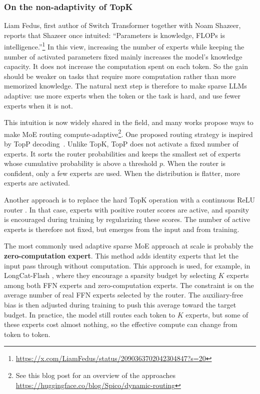\subsubsection{On the non-adaptivity of TopK}
Liam Fedus, first author of Switch Transformer together with Noam Shazeer,
reports that Shazeer once intuited:
``Parameters is knowledge, FLOPs is intelligence.''\footnote{
    \url{https://x.com/LiamFedus/status/2090363702042304847?s=20}
}
In this view, increasing the number of experts while keeping the number of
activated parameters fixed mainly increases the model's knowledge capacity.
It does not increase the computation spent on each token. So the gain should
be weaker on tasks that require more computation rather than more memorized
knowledge. The natural next step is therefore to make sparse LLMs adaptive:
use more experts when the token or the task is hard, and use fewer experts
when it is not.

This intuition is now widely shared in the field, and many works propose ways
to make MoE routing compute-adaptive\footnote{
    See this blog post for an overview of the approaches
    \url{https://huggingface.co/blog/Spico/dynamic-routing}
}. One proposed routing strategy is inspired by
TopP decoding~\citep{huang2024hardertasksneedexperts}. Unlike TopK, TopP does not activate a fixed number of experts.
It sorts the router probabilities and keeps the smallest set of experts whose
cumulative probability is above a threshold $p$. When the router is confident,
only a few experts are used. When the distribution is flatter, more experts are
activated.

Another approach is to replace the hard TopK operation with a continuous ReLU
router \citep{wang2025remoefullydifferentiablemixtureofexperts}. In that case,
experts with positive router scores are active, and sparsity is encouraged during
training by regularizing these scores. The number of active experts is
therefore not fixed, but emerges from the input and from training.

The most commonly used adaptive sparse MoE approach at scale is probably the
\textbf{zero-computation expert}. This method adds identity experts that
let the input pass through without computation.
This approach is used, for example, in LongCat-Flash
\citep{meituanlongcatteam2025longcatflashtechnicalreport}, 
where they encourage a sparsity budget by selecting $K$ experts among both
FFN experts and zero-computation experts. The constraint is 
on the average number of real FFN experts selected by the router. 
The auxiliary-free bias is then adjusted
during training to push this average toward the target budget. In practice, the
model still routes each token to $K$ experts, 
but some of these experts cost almost nothing, so the effective compute 
can change from token to token.

